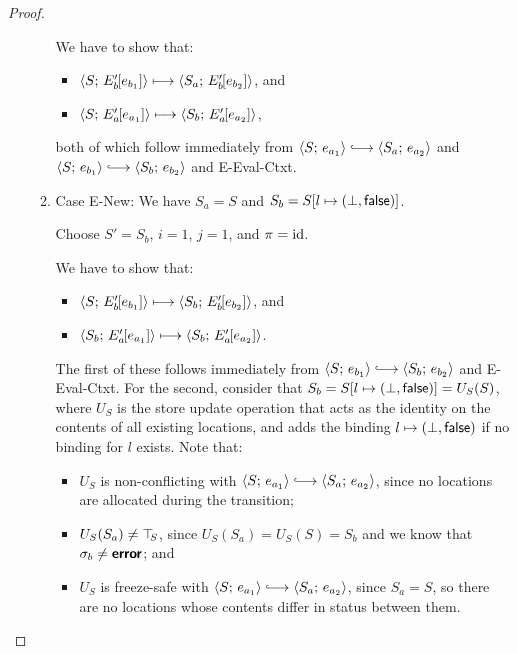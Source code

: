 \begin{proof}
\begin{enumerate}
\begin{enumerate}
      We have to show that:
      \begin{itemize}
      \item $\langle S;\, E'_b\hspace{-1mm}\left[e_{b_1}\right] \rangle \longmapsto
        \langle S_a;\, E'_b\hspace{-1mm}\left[e_{b_2}\right] \rangle$, and
      \item $\langle S;\, E'_a\hspace{-1mm}\left[e_{a_1}\right] \rangle \longmapsto
        \langle S_b;\, E'_a\hspace{-1mm}\left[e_{a_2}\right] \rangle$, 
      \end{itemize}

      both of which follow immediately from $\config{S}{e_{a_1}}
      \parstepsto \config{S_a}{e_{a_2}}$ and $\config{S}{e_{b_1}}
      \parstepsto \config{S_b}{e_{b_2}}$ and {\sc E-Eval-Ctxt}.

    \item \label{slqc-beta-new}Case {\sc E-New}: We have $S_a = S$ and
      $S_b = S[l \mapsto (\bot, \textsf{false})]$.

      Choose $S' = S_b$, $i = 1$, $j = 1$, and $\pi = \mathrm{id}$.

      We have to show that:
      \begin{itemize}
      \item $\langle S;\, E'_b\hspace{-1mm}\left[e_{b_1}\right] \rangle \longmapsto
        \langle S_b;\, E'_b\hspace{-1mm}\left[e_{b_2}\right] \rangle$, and
      \item
        $\langle S_b;\, E'_a\hspace{-1mm}\left[e_{a_1}\right] \rangle \longmapsto
        \langle S_b;\, E'_a\hspace{-1mm}\left[e_{a_2}\right] \rangle$.
      \end{itemize}

      The first of these follows immediately from $\config{S}{e_{b_1}}
      \parstepsto \config{S_b}{e_{b_2}}$ and {\sc E-Eval-Ctxt}.  For
      the second, consider that $S_b = S[l \mapsto (\bot, \textsf{false})]
      = U_S(S)$, where $U_S$ is the store update operation that acts
      as the identity on the contents of all existing locations, and
      adds the binding $l \mapsto (\bot, \textsf{false})$ if no
      binding for $l$ exists.  Note that:
      \begin{itemize}
      \item $U_S$ is non-conflicting with $\config{S}{e_{a_1}}
        \parstepsto \config{S_a}{e_{a_2}}$, since no locations are
        allocated during the transition;
        \item $U_S(S_a) \neq \top\hspace{-0.85mm}_{S}$, since $U_S(S_a) = U_S(S) = S_b$
          and we know that $\sigma_b \neq \textbf{\textsf{error}}$; and
        \item $U_S$ is freeze-safe with $\config{S}{e_{a_1}}
          \parstepsto \config{S_a}{e_{a_2}}$, since $S_a = S$, so
          there are no locations whose contents differ in status
          between them.
      \end{itemize}


\end{enumerate}
\end{enumerate}
\end{proof}
